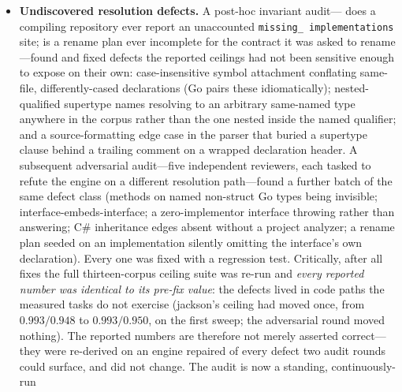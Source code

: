 \documentclass[11pt]{article}
\newcommand{\code}[1]{\texttt{#1}}
\begin{document}
\begin{itemize}[leftmargin=*]
such targets are now rejected at task-generation time), and Guava (310-site
replication, \cref{tab:guava}, $n{=}1$ per cell). Cross-language coverage
spans Go (grafana), TypeScript (TypeORM), and Python (Django). Two of the
four Go tasks (\cref{sec:go-declaration}) now run at $n{=}5$ across three
tiers (30 cells); the original grafana task and the TypeORM and Django
cells remain $n{=}1$ and warrant replication. A large Go codebase with wide
interfaces remains untested. The Python oracle relies on Jedi type
inference, which cannot follow dynamic multi-hop chains; nine additional
callers discovered by the engine were manually verified and added to the
ground-truth---a limitation of dynamically typed oracle targets absent from
the statically typed corpora.
\item \textbf{Undiscovered resolution defects.} A post-hoc invariant audit---
does a compiling repository ever report an unaccounted \code{missing\_%
implementations} site; is a rename plan ever incomplete for the contract it
was asked to rename---found and fixed defects the reported ceilings had not
been sensitive enough to expose on their own: case-insensitive symbol
attachment conflating same-file, differently-cased declarations (Go pairs
these idiomatically); nested-qualified supertype names resolving to an
arbitrary same-named type anywhere in the corpus rather than the one nested
inside the named qualifier; and a source-formatting edge case in the parser
that buried a supertype clause behind a trailing comment on a wrapped
declaration header. A subsequent adversarial audit---five independent
reviewers, each tasked to refute the engine on a different resolution
path---found a further batch of the same defect class (methods on named
non-struct Go types being invisible; interface-embeds-interface; a
zero-implementor interface throwing rather than answering; C\# inheritance
edges absent without a project analyzer; a rename plan seeded on an
implementation silently omitting the interface's own declaration). Every one
was fixed with a regression test. Critically, after all fixes the full
thirteen-corpus ceiling suite was re-run and \emph{every reported number was
identical to its pre-fix value}: the defects lived in code paths the measured
tasks do not exercise (jackson's ceiling had moved once, from $0.993/0.948$
to $0.993/0.950$, on the first sweep; the adversarial round moved nothing).
The reported numbers are therefore not merely asserted correct---they were
re-derived on an engine repaired of every defect two audit rounds could
surface, and did not change. The audit is now a standing, continuously-run

\end{itemize}
\end{document}
